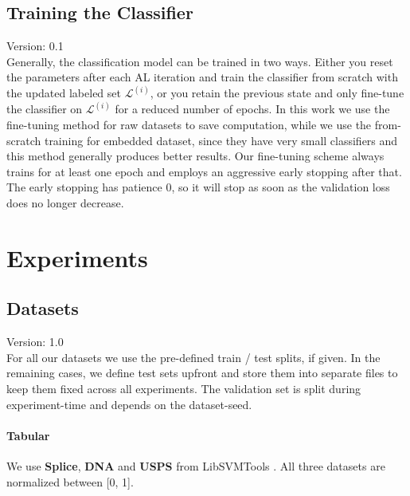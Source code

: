 \documentclass[]{article}
\begin{document}
\subsection{Training the Classifier}\label{sec:training_the_classifier}
{\color{red} Version: 0.1}\\
Generally, the classification model can be trained in two ways. Either you reset the parameters after each AL iteration and train the classifier from scratch with the updated labeled set $\mathcal{L}^{(i)}$, or you retain the previous state and only fine-tune the classifier on $\mathcal{L}^{(i)}$ for a reduced number of epochs.
In this work we use the fine-tuning method for raw datasets to save computation, while we use the from-scratch training for embedded dataset, since they have very small classifiers and this method generally produces better results.
Our fine-tuning scheme always trains for at least one epoch and employs an aggressive early stopping after that.
The early stopping has patience 0, so it will stop as soon as the validation loss does no longer decrease.

\section{Experiments}

\subsection{Datasets}\label{sec:datasets}
{\color{red} Version: 1.0}\\
For all our datasets we use the pre-defined train / test splits, if given. 
In the remaining cases, we define test sets upfront and store them into separate files to keep them fixed across all experiments.
The validation set is split during experiment-time and depends on the dataset-seed.

\paragraph{Tabular}
We use \textbf{Splice}, \textbf{DNA} and \textbf{USPS} from LibSVMTools \cite{libsvmtools}.
All three datasets are normalized between [0, 1].
\end{document}
